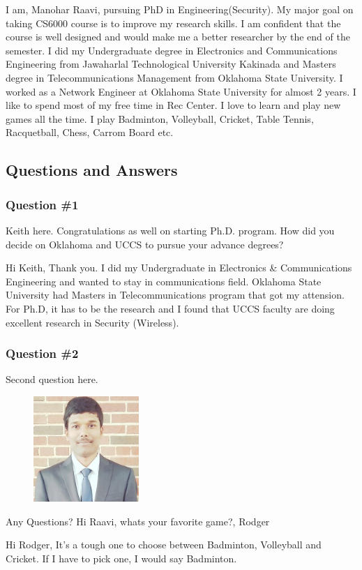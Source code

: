
I am, Manohar Raavi, pursuing PhD in Engineering(Security). My major goal on taking CS6000 course is to improve my research skills. 
I am confident that the course is well designed and would make me a better researcher by the end of the semester.
 I did my Undergraduate degree in Electronics and Communications Engineering from Jawaharlal Technological University Kakinada and Masters degree in Telecommunications Management from Oklahoma State University. I worked as a Network Engineer at Oklahoma State University for almost 2 years. I like to spend most of my free time in Rec Center.
 I love to learn and play new games all the time. I play Badminton, Volleyball, Cricket, Table Tennis, Racquetball, Chess, Carrom Board etc.

\subsection{Questions and Answers}
\subsubsection {Question \#1}
Keith here. Congratulations as well on starting Ph.D. program. How did you decide on Oklahoma and UCCS to pursue your advance degrees?

Hi Keith,
Thank you. I did my Undergraduate in Electronics \& Communications Engineering and wanted to stay in communications field.
Oklahoma State University had Masters in Telecommunications program that got my attension. For Ph.D, it has to be the research and I found that UCCS faculty are doing excellent research in Security (Wireless).



\subsubsection {Question \#2}

Second question here.

\begin{figure}[htp]
    \centering
    \includegraphics[width=4cm]{linkd1}
\end{figure}

Any Questions?
Hi Raavi, whats your favorite game?, Rodger

Hi Rodger, It's a tough one to choose between Badminton, Volleyball and Cricket. If I have to pick one, I would say Badminton.